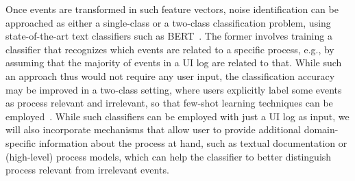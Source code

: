 Once events are transformed in such feature vectors, noise identification can be approached as either a single-class or a two-class classification problem, using state-of-the-art text classifiers such as BERT~\cite{Devlin2019}. The former involves training a classifier that recognizes which events are related to a specific process, e.g., by assuming that the majority of events in a UI log are related to that. While such an approach thus would not require any user input, the classification accuracy may be improved in a two-class setting, where users explicitly label some events as process relevant and irrelevant, so that few-shot learning techniques can be employed~\cite{yu2018diverse}.
While such classifiers can be employed with just a UI log as input, we will also incorporate mechanisms that allow user to provide additional domain-specific information about the process at hand, such as textual documentation or (high-level) process models, which can help the classifier to better distinguish process relevant from irrelevant events.

